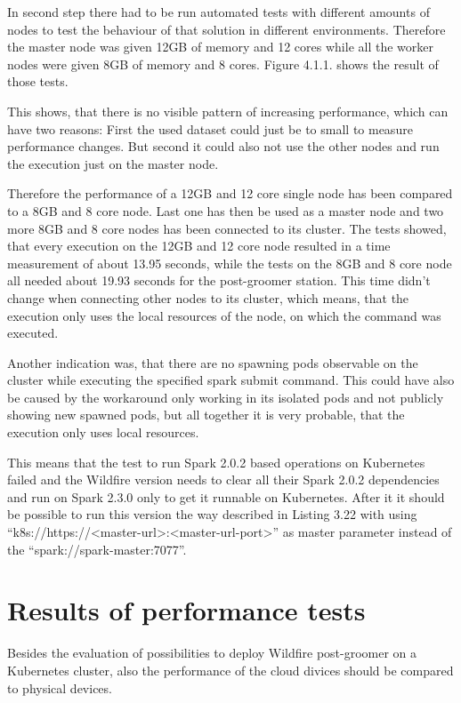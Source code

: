 In second step there had to be run automated tests with different amounts of nodes to test the behaviour of that solution in different environments. Therefore the master node was given 12GB of memory and 12 cores while all the worker nodes were given 8GB of memory and 8 cores. Figure 4.1.1. shows the result of those tests.

This shows, that there is no visible pattern of increasing performance, which can have two reasons: First the used dataset could just be to small to measure performance changes. But second it could also not use the other nodes and run the execution just on the master node.

Therefore the performance of a 12GB and 12 core single node has been compared to a 8GB and 8 core node. Last one has then be used as a master node and two more 8GB and 8 core nodes has been connected to its cluster. The tests showed, that every execution on the 12GB and 12 core node resulted in a time measurement of about 13.95 seconds, while the tests on the 8GB and 8 core node all needed about 19.93 seconds for the post-groomer station. This time didn't change when connecting other nodes to its cluster, which means, that the execution only uses the local resources of the node, on which the command was executed.

Another indication was, that there are no spawning pods observable on the cluster while executing the specified spark submit command. This could have also be caused by the workaround only working in its isolated pods and not publicly showing new spawned pods, but all together it is very probable, that the execution only uses local resources.

This means that the test to run Spark 2.0.2 based operations on Kubernetes failed and the Wildfire version needs to clear all their Spark 2.0.2 dependencies and run on Spark 2.3.0 only to get it runnable on Kubernetes. After it it should be possible to run this version the way described in Listing 3.22 with using ``k8s://https://<master-url>:<master-url-port>'' as master parameter instead of the ``spark://spark-master:7077''.

\section{Results of performance tests}

Besides the evaluation of possibilities to deploy Wildfire post-groomer on a Kubernetes cluster, also the performance of the cloud divices should be compared to physical devices.

